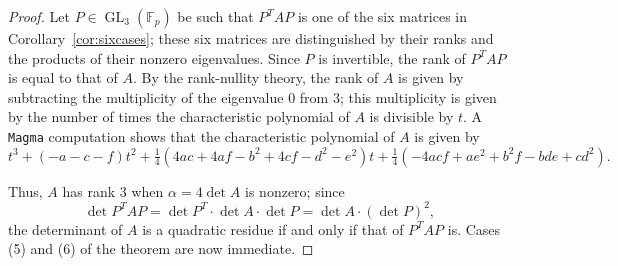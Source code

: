 \documentclass[10pt,a4paper]{amsart}
\numberwithin{equation}{section}
\numberwithin{figure}{section}
\theoremstyle{definition}
\theoremstyle{remark}
\theoremstyle{plain}
\theoremstyle{plain}
\theoremstyle{definition}
\theoremstyle{plain}
\theoremstyle{plain}
\newcommand{\F}{\mathbb{F}}
\newcommand{\GL}{\operatorname{GL}}
\begin{document}
	\begin{proof}
	Let $P\in\GL_3(\F_p)$ be such that $P^TAP$ is one of the six matrices in Corollary~\ref{cor:sixcases}; these six matrices are distinguished by their ranks and the products of their nonzero eigenvalues. Since $P$ is invertible, the rank of $P^TAP$ is equal to that of $A$. By the rank-nullity theory, the rank of $A$ is given by subtracting the multiplicity of the eigenvalue $0$ from $3$; this multiplicity is given by the number of times the characteristic polynomial of $A$ is divisible by $t$. A \texttt{Magma} \cite{magma} computation shows that the characteristic polynomial of $A$ is given by
	\begin{equation*}
	t^3+(-a-c-f)t^2+\tfrac{1}{4}(4ac+4af-b^2+4cf-d^2-e^2)t+\tfrac{1}{4}(-4acf+ae^2+b^2f-bde+cd^2).
	\end{equation*}
	
	Thus, $A$ has rank $3$ when $\alpha=4\det A$ is nonzero; since
	\begin{equation*}
	\det P^TAP=\det P^T\cdot\det A\cdot\det P=\det A\cdot(\det P)^2,
	\end{equation*}
	the determinant of $A$ is a quadratic residue if and only if that of $P^TAP$ is. Cases (5) and (6) of the theorem are now immediate.
	

\end{proof}
\end{document}
